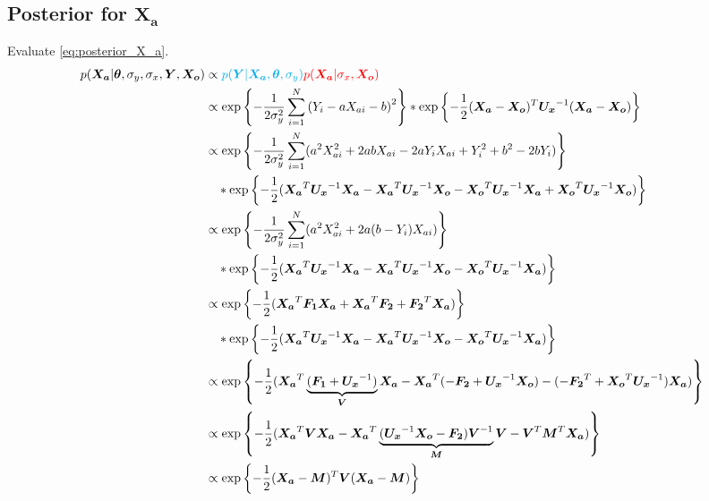 \documentclass[10pt]{article}
\renewcommand{\vec}[1]{\boldsymbol{#1}}
\newcommand{\mat}[1]{\boldsymbol{#1}}
\begin{document}
\subsection{Posterior for $\vec{X_a}$}
Evaluate \cref{eq:posterior_X_a}.
\begin{align}
    p(\vec{X_a} | \vec{\theta}, \sigma_y, \sigma_x, \vec{Y}, \vec{X_o}) &\propto {\color{cyan} p(\vec{Y} | \vec{X_a}, \vec{\theta}, \sigma_y)} {\color{red} p(\vec{X_a} | \sigma_x, \vec{X_o})} \\
    &\propto \exp\left\{ - \frac{1}{2\sigma_y^2} \sum_{i=1}^N \left( Y_i - a X_{ai} - b \right)^2 \right\} * \exp\left\{ - \frac{1}{2} (\vec{X_a} - \vec{X_o})^T \mat{U_x}^{-1} (\vec{X_a} - \vec{X_o}) \right\} \\
    
    &\propto \exp\left\{ - \frac{1}{2\sigma_y^2} \sum_{i=1}^N (a^2 X_{ai}^2  + 2 a b X_{ai} - 2 a Y_i X_{ai} + Y_i^2 + b^2 -2 b Y_i) \right\} \nonumber \\
    &\quad * \exp\left\{ - \frac{1}{2} ( \vec{X_a}^T \mat{U_x}^{-1} \vec{X_a} - \vec{X_a}^T \mat{U_x}^{-1} \vec{X_o} -\vec{X_o}^T \mat{U_x}^{-1} \vec{X_a} + \vec{X_o}^T \mat{U_x}^{-1} \vec{X_o} ) \right\} \\
    
    &\propto \exp\left\{ - \frac{1}{2\sigma_y^2} \sum_{i=1}^N (a^2 X_{ai}^2  + 2 a (b - Y_i) X_{ai} ) \right\} \nonumber \\
    &\quad * \exp\left\{ - \frac{1}{2} ( \vec{X_a}^T \mat{U_x}^{-1} \vec{X_a} - \vec{X_a}^T \mat{U_x}^{-1} \vec{X_o} -\vec{X_o}^T \mat{U_x}^{-1} \vec{X_a}) \right\} \\
    
    &\propto \exp\left\{ - \frac{1}{2} (\vec{X_a}^T \mat{F_1} \vec{X_a} + \vec{X_a}^T \vec{F_2} + \vec{F_2}^T \vec{X_a}) \right\} \nonumber \\
    &\quad * \exp\left\{ - \frac{1}{2} ( \vec{X_a}^T \mat{U_x}^{-1} \vec{X_a} - \vec{X_a}^T \mat{U_x}^{-1} \vec{X_o} -\vec{X_o}^T \mat{U_x}^{-1} \vec{X_a}) \right\} \\
    
    &\propto \exp\left\{ - \frac{1}{2} (\vec{X_a}^T \underbrace{(\mat{F_1} + \mat{U_x}^{-1})}_{\mat{V}} \vec{X_a} - \vec{X_a}^T (- \vec{F_2} + \mat{U_x}^{-1} \vec{X_o}) - (- \vec{F_2}^T + \vec{X_o}^T \mat{U_x}^{-1}) \vec{X_a}) \right\} \\
    
    &\propto \exp\left\{ - \frac{1}{2} (\vec{X_a}^T \mat{V} \vec{X_a} - \vec{X_a}^T \underbrace{(\mat{U_x}^{-1} \vec{X_o} - \vec{F_2}) \mat{V}^{-1}}_{\vec{M}} \mat{V} - \mat{V}^T \vec{M}^T \vec{X_a}) \right\} \\
    
    &\propto \exp\left\{ - \frac{1}{2} (\vec{X_a} - \vec{M})^T \mat{V} (\vec{X_a} - \vec{M}) \right\}

\end{align}
\end{document}
